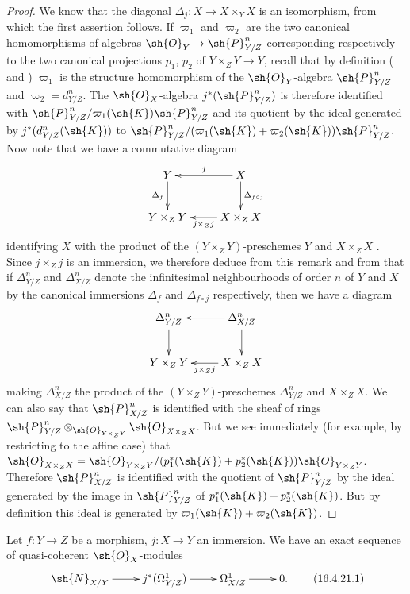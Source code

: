\begin{proof}
We know  that the diagonal $\Delta_j:X \to X \times_Y X$ is an isomorphism, from which the first assertion follows.
If $\varpi_1$ and $\varpi_2$ are the two canonical homomorphisms of algebras $\sh{O}_Y \to \sh{P}_{Y/Z}^n$ corresponding respectively to the two canonical projections $p_1$, $p_2$ of $Y \times_Z Y \to Y$, recall that by definition ( and ) $\varpi_1$ is the structure homomorphism of the $\sh{O}_Y$-algebra $\sh{P}_{Y/Z}^n$ and $\varpi_2 = d_{Y/Z}^n$.
The $\sh{O}_X$-algebra $j^*(\sh{P}_{Y/Z}^n)$ is therefore identified with $\sh{P}_{Y/Z}^n/\varpi_1(\sh{K})\sh{P}_{Y/Z}^n$ and its quotient by the ideal generated by $j^*(d_{Y/Z}^n(\sh{K}))$ to $\sh{P}_{Y/Z}^n/(\varpi_1(\sh{K}) + \varpi_2(\sh{K}))\sh{P}_{Y/Z}^n$.
Now note that we have a commutative diagram
\[
  \xymatrix{
  Y \ar[d]_-{\Delta_f} & X \ar[d]^-{\Delta_{f \circ j}} \ar[l]_-{j}  \\
  Y \times_Z Y & X \times_Z X \ar[l]^-{j \times_Z j} 
  }
\]
identifying $X$ with the product of the $(Y \times_Z Y)$-preschemes $Y$ and $X \times_Z X$ .
Since $j \times_Z j$ is an immersion, we therefore deduce from this remark and from  that if $\Delta_{Y/Z}^n$ and $\Delta_{X/Z}^n$ denote the infinitesimal neighbourhoods of order $n$ of $Y$ and $X$ by the canonical immersions $\Delta_f$ and $\Delta_{f\circ j}$ respectively, then we have a diagram
\[
  \xymatrix{
  \Delta_{Y/Z}^n \ar[d] & \Delta_{X/Z}^n \ar[d] \ar[l]  \\
  Y \times_Z Y & X \times_Z X \ar[l]^-{j \times_Z j} 
  }
\]
making $\Delta_{X/Z}^n$ the product of the $(Y \times_Z Y)$-preschemes $\Delta_{Y/Z}^n$ and $X \times_Z X$.
We can also say that $\sh{P}_{X/Z}^n$ is identified with the sheaf of rings $\sh{P}_{Y/Z}^n \otimes_{\sh{O}_{Y \times_Z Y}} \sh{O}_{X \times_Z X}$.
But we see immediately (for example, by restricting to the affine case) that $\sh{O}_{X \times_Z X} = \sh{O}_{Y \times_Z Y}/(p_1^*(\sh{K}) + p_2^*(\sh{K}))\sh{O}_{Y \times_Z Y}$.
Therefore $\sh{P}_{X/Z}^n$ is identified with the quotient of $\sh{P}_{Y/Z}^n$ by the ideal generated by the image in $\sh{P}_{Y/Z}^n$ of $p_1^*(\sh{K}) + p_2^*(\sh{K})$.
But by definition this ideal is generated by $\varpi_1(\sh{K}) + \varpi_2(\sh{K})$. 
\end{proof}

\begin{corollary}[16.4.21]
\label{IV.16.4.21}
Let $f:Y \to Z$ be a morphism, $j: X \to Y$ an immersion.
We have an exact sequence of quasi-coherent $\sh{O}_X$-modules
\[
  \label{IV.16.4.21.1}
  \xymatrix{
    \sh{N}_{X/Y} \ar[r] & j^*(\Omega_{Y/Z}^1) \ar[r] & \Omega_{X/Z}^1 \ar[r] & 0.
  }
  \tag{16.4.21.1}
\]
\end{corollary}

